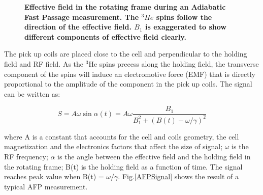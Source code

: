 \begin{figure}[H]
	\centering
	\caption{{\bf Effective field in the rotating frame during an Adiabatic Fast Passage measurement. The $^{3}He$ spins follow the direction of the effective field. $B_{1}$ is exaggerated to show different components of effective field clearly.}}
	\label{AFP}
\end{figure}

The pick up coils are placed close to the cell and perpendicular to the holding field and RF field. As the $^{3}$He spins precess along the holding field, the transverse component of the spins will induce an electromotive force (EMF) that is directly proportional to the amplitude of the component in the pick up coils. The signal can be written as:

\begin{equation}
S=A\omega \sin{\alpha(t)}=A\omega \frac{B_{1}}{B_{1}^{2}+(B(t)-\omega/\gamma)^{2}}
\end{equation}

where A is a constant that accounts for the cell and coils geometry, the cell magnetization and the electronics factors that affect the size of signal; $\omega$ is the RF frequency; $\alpha$ is the angle between the effective field and the holding field in the rotating frame; B(t) is the holding field as a function of time. The signal reaches peak value when B(t) = $\omega/\gamma$. Fig.\ref{AFPSignal} shows the result of a typical AFP measurement.

